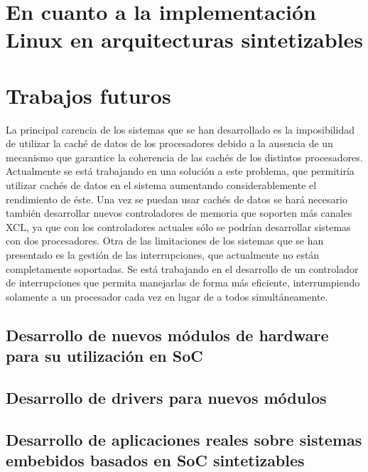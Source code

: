 	
	\section{En cuanto a la implementación Linux en arquitecturas sintetizables} 
		


	\section{Trabajos futuros}

La principal carencia de los sistemas que se han desarrollado es la imposibilidad de utilizar la caché de datos de los procesadores debido a la
ausencia de un mecanismo que garantice la coherencia de las cachés de los distintos procesadores. Actualmente se está trabajando en una solución a
este problema, que permitiría utilizar cachés de datos en el sistema aumentando considerablemente el rendimiento de éste. Una vez se puedan usar
cachés de datos se hará necesario también desarrollar nuevos controladores de memoria que soporten más canales XCL, ya que con los controladores
actuales sólo se podrían desarrollar sistemas con dos procesadores. Otra de las limitaciones de los sistemas que se han presentado es la gestión de
las interrupciones, que actualmente no están completamente soportadas. Se está trabajando en el desarrollo de un controlador de interrupciones que
permita manejarlas de forma más eficiente, interrumpiendo solamente a un procesador cada vez en lugar de a todos simultáneamente.

		\subsection{Desarrollo de nuevos módulos de hardware para su utilización en SoC}
		
		\subsection{Desarrollo de drivers para nuevos módulos}
		
		\subsection{Desarrollo de aplicaciones reales sobre sistemas embebidos basados en SoC sintetizables}
		
		
	
	 